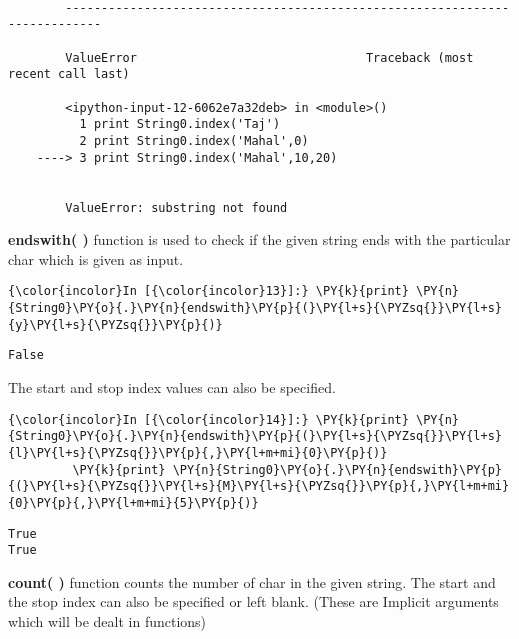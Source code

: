     \begin{Verbatim}[commandchars=\\\{\}]

        ---------------------------------------------------------------------------

        ValueError                                Traceback (most recent call last)

        <ipython-input-12-6062e7a32deb> in <module>()
          1 print String0.index('Taj')
          2 print String0.index('Mahal',0)
    ----> 3 print String0.index('Mahal',10,20)
    

        ValueError: substring not found

    \end{Verbatim}

    \textbf{endswith( )} function is used to check if the given string ends
with the particular char which is given as input.

    \begin{Verbatim}[commandchars=\\\{\}]
{\color{incolor}In [{\color{incolor}13}]:} \PY{k}{print} \PY{n}{String0}\PY{o}{.}\PY{n}{endswith}\PY{p}{(}\PY{l+s}{\PYZsq{}}\PY{l+s}{y}\PY{l+s}{\PYZsq{}}\PY{p}{)}
\end{Verbatim}

    \begin{Verbatim}[commandchars=\\\{\}]
False
    \end{Verbatim}

    The start and stop index values can also be specified.

    \begin{Verbatim}[commandchars=\\\{\}]
{\color{incolor}In [{\color{incolor}14}]:} \PY{k}{print} \PY{n}{String0}\PY{o}{.}\PY{n}{endswith}\PY{p}{(}\PY{l+s}{\PYZsq{}}\PY{l+s}{l}\PY{l+s}{\PYZsq{}}\PY{p}{,}\PY{l+m+mi}{0}\PY{p}{)}
         \PY{k}{print} \PY{n}{String0}\PY{o}{.}\PY{n}{endswith}\PY{p}{(}\PY{l+s}{\PYZsq{}}\PY{l+s}{M}\PY{l+s}{\PYZsq{}}\PY{p}{,}\PY{l+m+mi}{0}\PY{p}{,}\PY{l+m+mi}{5}\PY{p}{)}
\end{Verbatim}

    \begin{Verbatim}[commandchars=\\\{\}]
True
True
    \end{Verbatim}

    \textbf{count( )} function counts the number of char in the given
string. The start and the stop index can also be specified or left
blank. (These are Implicit arguments which will be dealt in functions)

